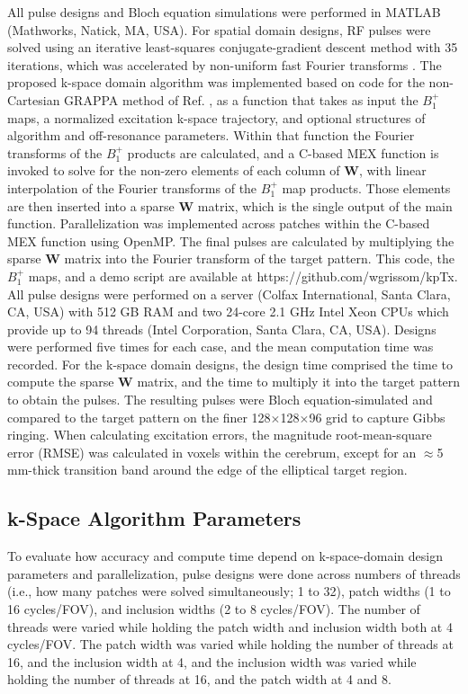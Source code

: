 \par All pulse designs and Bloch equation simulations were performed in MATLAB (Mathworks, Natick, MA, USA).
For spatial domain designs, 
RF pulses were solved using an iterative least-squares conjugate-gradient descent method \cite{Grissom:2006:MRM} with 35 iterations,
which was accelerated by non-uniform fast Fourier transforms \cite{Fessler:2003fk}. 
The proposed k-space domain algorithm was implemented based on code for the non-Cartesian GRAPPA method of Ref. \cite{luo2019grappa},
as a function that takes as input the $B_1^+$ maps, 
a normalized excitation k-space trajectory, and optional structures of algorithm and off-resonance parameters. 
Within that function the Fourier transforms of the $B_1^+$ products are calculated,
and a C-based MEX function is invoked to solve for the non-zero elements of each column of $\bm{W}$,
with linear interpolation of the Fourier transforms of the $B_1^+$ map products. 
Those elements are then inserted into a sparse $\bm{W}$ matrix, which is the single output of the main function. 
Parallelization was implemented across patches within the C-based MEX function using OpenMP. 
The final pulses are calculated by multiplying the sparse $\bm{W}$ matrix into the Fourier transform of the target pattern. 
This code, the $B_1^+$ maps, and a demo script are available at https://github.com/wgrissom/kpTx. 
All pulse designs were performed on a server (Colfax International, Santa Clara, CA, USA) 
with 512 GB RAM and two 24-core 2.1 GHz Intel Xeon CPUs which provide up to 94 threads (Intel Corporation, Santa Clara, CA, USA). 
Designs were performed five times for each case, and the mean computation time was recorded.
For the k-space domain designs, the design time comprised the time to compute the sparse $\bm{W}$ matrix, 
and the time to multiply it into the target pattern to obtain the pulses.
The resulting pulses were Bloch equation-simulated and compared to the target pattern on the finer 128$\times$128$\times$96 grid to capture Gibbs ringing. 
When calculating excitation errors, the magnitude root-mean-square error (RMSE) was calculated in voxels within the cerebrum,
except for an $\approx$5 mm-thick transition band around the edge of the elliptical target region.

\subsection*{k-Space Algorithm Parameters}
To evaluate how accuracy and compute time depend on k-space-domain design parameters and parallelization,
pulse designs were done across numbers of threads (i.e., how many patches were solved simultaneously; 1 to 32), 
patch widths (1 to 16 cycles/FOV), and inclusion widths (2 to 8 cycles/FOV). 
The number of threads were varied while holding the patch width and inclusion width both at 4 cycles/FOV.
The patch width was varied while holding the number of threads at 16, and the inclusion width at 4,
and the inclusion width was varied while holding the number of threads at 16, and the patch width at 4 and 8. 

